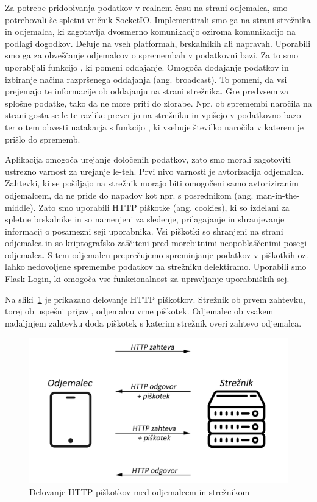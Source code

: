 \documentclass[a4paper, 12pt]{book}
\begin{document}
Za potrebe pridobivanja podatkov v realnem času na strani odjemalca, smo potrebovali še spletni vtičnik SocketIO. Implementirali smo ga na strani strežnika in odjemalca, ki zagotavlja dvosmerno komunikacijo oziroma komunikacijo na podlagi dogodkov. Deluje na vseh platformah, brskalnikih ali napravah. Uporabili smo ga za obveščanje odjemalcov o spremembah v podatkovni bazi. Za to smo uporabljali funkcijo , ki pomeni oddajanje. Omogoča dodajanje podatkov in izbiranje načina razpršenega oddajanja (ang. broadcast). To pomeni, da vsi prejemajo te informacije ob oddajanju na strani strežnika. Gre predvsem za splošne podatke, tako da ne more priti do zlorabe. Npr. ob spremembi naročila na strani gosta se le te razlike preverijo na strežniku in vpišejo v podatkovno bazo ter o tem obvesti natakarja s funkcijo , ki vsebuje številko naročila v katerem je prišlo do sprememb. 
	

Aplikacija omogoča urejanje določenih podatkov, zato smo morali zagotoviti ustrezno varnost za urejanje le-teh. Prvi nivo varnosti je avtorizacija odjemalca. Zahtevki, ki se pošiljajo na strežnik morajo biti omogočeni samo avtoriziranim odjemalcem, da ne pride do napadov kot npr. s posrednikom (ang. man-in-the-middle). Zato smo uporabili HTTP piškotke (ang. cookies), ki so izdelani za spletne brskalnike in so namenjeni za sledenje, prilagajanje in shranjevanje informacij o posamezni seji uporabnika. Vsi piškotki so shranjeni na strani odjemalca in so kriptografsko zaščiteni pred morebitnimi neopoblaščenimi posegi odjemalca. S tem odjemalcu preprečujemo spreminjanje podatkov v piškotkih oz. lahko nedovoljene spremembe podatkov na strežniku delektiramo. Uporabili smo Flask-Login, ki omogoča vse funkcionalnost za upravljanje uporabniških sej. 

Na sliki~\ref{Cookies} je prikazano delovanje HTTP piškotkov. Strežnik ob prvem zahtevku, torej ob uspešni prijavi, odjemalcu vrne piškotek. Odjemalec ob vsakem nadaljnjem zahtevku doda piškotek s katerim strežnik overi zahtevo odjemalca.

\begin{figure}[!htb]
\begin{center}
\includegraphics[width=14cm]{cookie-how1.png}
\caption{Delovanje HTTP piškotkov med odjemalcem in strežnikom}
\label{Cookies}
\end{center}
\end{figure}
\end{document}
